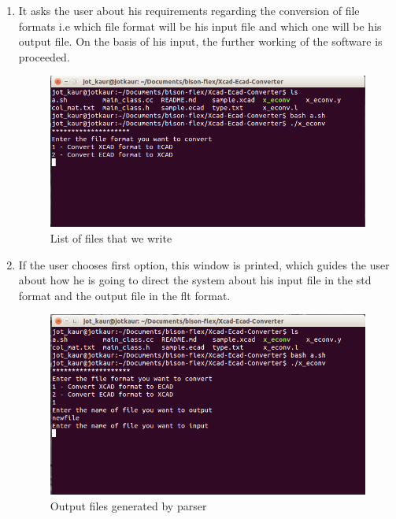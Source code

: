 \begin{enumerate}
\item It asks the user about his requirements regarding the conversion of file formats i.e which file format will be his input file and which one will be his output file. On the basis of his input, the further working of the software is proceeded.
\begin{figure} [h!]
\centering
\includegraphics[scale=0.3]{images/ecad2.png}
\caption{List of files that we write}
\end{figure}

\item If the user chooses first option, this window is printed, which guides the user about how he is going to direct the system about his input file in the std format and the output file in the flt format.
\begin{figure} [h!]
\centering
\includegraphics[scale=0.3]{images/ecad3.png}
\caption{Output files generated by parser}
\end{figure}


\end{enumerate}
